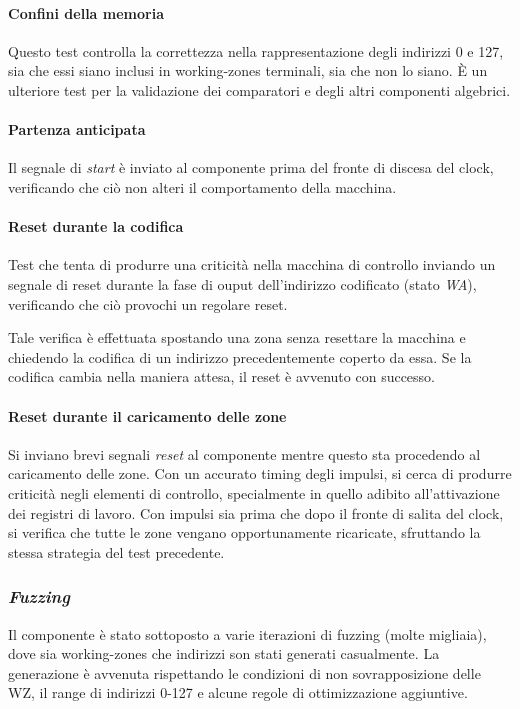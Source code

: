 \documentclass[11pt,a4paper]{article}
\begin{document}
\paragraph{Confini della memoria}
Questo test controlla la correttezza nella rappresentazione degli indirizzi 0 e 127, sia che essi siano inclusi in working-zones terminali, sia che non lo
siano. È un ulteriore test per la validazione dei comparatori e degli altri componenti algebrici.

\paragraph{Partenza anticipata}
Il segnale di \emph{start} è inviato al componente prima del fronte di discesa del clock, verificando che ciò non alteri il comportamento della macchina.

\paragraph{Reset durante la codifica}
Test che tenta di produrre una criticità nella macchina di controllo inviando un segnale di reset durante la fase di ouput dell'indirizzo codificato (stato
\emph{WA}), verificando che ciò provochi un regolare reset.

Tale verifica è effettuata spostando una zona senza resettare la macchina e chiedendo la codifica di un indirizzo precedentemente coperto da essa. Se la
codifica cambia nella maniera attesa, il reset è avvenuto con successo.

\paragraph{Reset durante il caricamento delle zone}
Si inviano brevi segnali \emph{reset} al componente mentre questo sta procedendo al caricamento delle zone. Con un accurato timing degli impulsi, si cerca
di produrre criticità negli elementi di controllo, specialmente in quello adibito all'attivazione dei registri di lavoro. Con impulsi sia prima che dopo
il fronte di salita del clock, si verifica che tutte le zone vengano opportunamente ricaricate, sfruttando la stessa strategia del test precedente.

\subsubsection{\emph{Fuzzing}}
Il componente è stato sottoposto a varie iterazioni di fuzzing (molte migliaia), dove sia working-zones che indirizzi son stati generati casualmente.
La generazione è avvenuta  rispettando le condizioni di non sovrapposizione delle WZ, il range di indirizzi 0-127 e alcune regole di ottimizzazione
aggiuntive.
\end{document}
